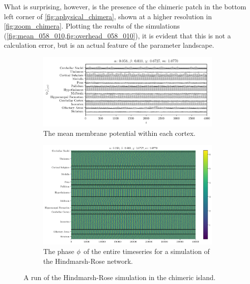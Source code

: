 What is surprising, however, is the presence of the chimeric patch in the bottom left corner of \cref{fig:aphysical_chimera}, shown at a higher resolution in \cref{fig:zoom_chimera}.
Plotting the results of the simulations (\cref{fig:mean_058_010,fig:overhead_058_010}),
it is evident that this is not a calculation error, but is an actual feature of the parameter landscape.
\begin{figure}[ht]
  \centering
  \begin{subfigure}{\textwidth}
    \includegraphics[width=\textwidth]{figure/means-0_058-0_010}
    \caption{The mean membrane potential within each cortex.}
    \label{fig:mean_058_010}
  \end{subfigure}
  \begin{subfigure}{\textwidth}
    \includegraphics[width=\textwidth]{figure/overhead-0_058-0_010}
    \caption{The phase $\phi$ of the entire timeseries for a simulation of the Hindmarsh-Rose network.}
    \label{fig:overhead_058_010}
  \end{subfigure}
  \caption[Highly chimeric simulation]{A run of the Hindmarsh-Rose simulation in the chimeric island.}
  \label{fig:058_010}
\end{figure}

